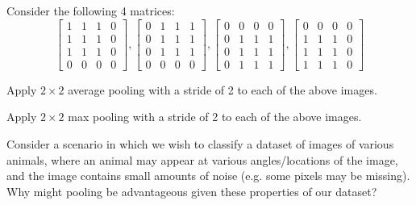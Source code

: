 Consider the following 4 matrices:
$$
\begin{bmatrix}
    1 & 1 & 1 & 0 \\
    1 & 1 & 1 & 0 \\
    1 & 1 & 1 & 0 \\
    0 & 0 & 0 & 0
\end{bmatrix},
%
\begin{bmatrix}
    0 & 1 & 1 & 1 \\
    0 & 1 & 1 & 1 \\
    0 & 1 & 1 & 1 \\
    0 & 0 & 0 & 0
\end{bmatrix},
%
\begin{bmatrix}
	0 & 0 & 0 & 0 \\
    0 & 1 & 1 & 1 \\
    0 & 1 & 1 & 1 \\
    0 & 1 & 1 & 1
\end{bmatrix},
%
\begin{bmatrix}
    0 & 0 & 0 & 0 \\
    1 & 1 & 1 & 0 \\
    1 & 1 & 1 & 0 \\
    1 & 1 & 1 & 0
\end{bmatrix}
$$
\problem[3]

Apply $2 \times 2$ average pooling with a stride of 2 to each of the above images.

\begin{subsolution}

\end{subsolution}

\problem[3]

Apply $2 \times 2$ max pooling with a stride of 2 to each of the above images.

\begin{subsolution}

\end{subsolution}

\problem[4]

Consider a scenario in which we wish to classify a dataset of images of various animals, where an animal may appear at various angles/locations of the image, and the image contains small amounts of noise (e.g. some pixels may be missing). Why might pooling be advantageous given these properties of our dataset?

\begin{subsolution}

\end{subsolution}

